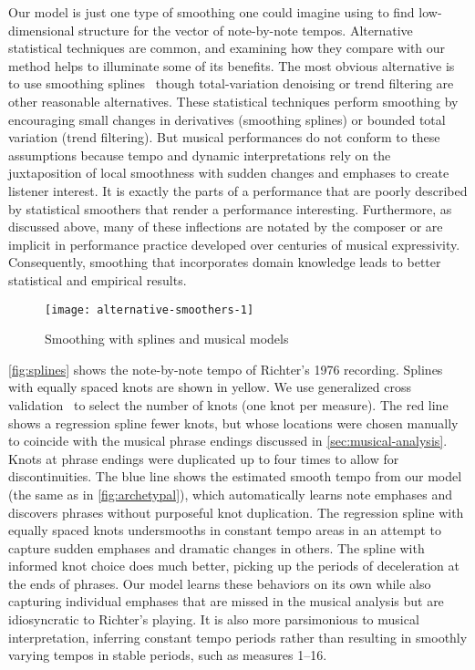 \documentclass[12pt]{article}
\begin{document}
Our model is just one type of smoothing one could imagine using to
find low-dimensional structure for the vector of note-by-note
tempos. Alternative statistical techniques are common, and examining
how they compare with our method helps to illuminate some of its
benefits. The most obvious alternative is to use smoothing
splines~\citep{CravenWahba1978,Wahba1990} though total-variation
denoising or trend filtering \citep{KimKoh2009,Tibshirani2014} are
other reasonable alternatives.
These statistical techniques perform smoothing by encouraging small
changes in derivatives (smoothing splines) or bounded total variation
(trend filtering). 
But musical performances do not conform to these assumptions because tempo and
dynamic interpretations rely on the juxtaposition of local smoothness
with sudden changes and emphases to create listener interest. It is
exactly the parts of a performance that are poorly described by
statistical smoothers that render a performance
interesting. Furthermore, as discussed above, many of these
inflections are notated by the 
composer or are implicit in performance practice developed over
centuries of musical expressivity. Consequently, smoothing that
incorporates domain knowledge leads to better statistical and
empirical results.
\begin{figure}[t]
  \centering
  \texttt{[image: alternative-smoothers-1]}
  \caption{Smoothing with splines and musical models}
  \label{fig:splines}
\end{figure}

\autoref{fig:splines}
shows the note-by-note tempo of Richter's 1976 recording. Splines with
equally spaced knots are shown in yellow. We use generalized cross
validation~\citep{GolubHeath1979} to select the number of knots (one
knot per measure). The red line shows a regression spline fewer knots,
but whose locations were chosen
manually
to coincide with the musical phrase endings discussed in
\autoref{sec:musical-analysis}. Knots at phrase endings were
duplicated up to four times to allow for discontinuities. The blue line 
shows the estimated smooth tempo from our model (the same as in
\autoref{fig:archetypal}), which
automatically learns note emphases and discovers phrases
without purposeful knot duplication. The regression spline with
equally spaced knots undersmooths in constant tempo areas in an
attempt to capture sudden emphases and dramatic changes in others. The spline
with informed knot choice does much better, picking up the periods of
deceleration at the ends of phrases. Our model learns these behaviors
on its own while also capturing individual emphases that are missed in
the musical analysis but are idiosyncratic to Richter's playing. It is
also more parsimonious to musical interpretation, inferring constant
tempo periods rather than resulting in smoothly varying tempos in
stable periods, such as measures 1--16.
\end{document}
